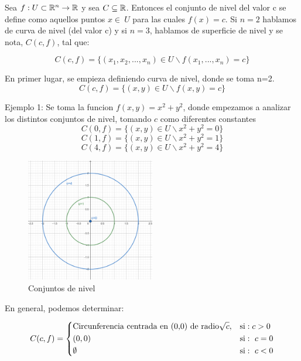 
\begin{definition}  
\label{def:conjunto de nivel}
 \mbox{}
 
Sea $f: U\subset\mathbb{R}^n\rightarrow\mathbb{R}$ y sea $C\subseteq\mathbb{R}$. Entonces el conjunto de nivel del valor c se define como aquellos puntos $x\in\ U$ para las cuales $f(x)=c$. Si $n=2$ hablamos de curva de nivel (del valor c) y si $n=3$, hablamos de superficie de nivel y se nota, $C(c,f)$, tal que:

 \[
C(c,f)=\{(x_1,x_2,...,x_n) \in U \backslash f (x_1,...,x_n)=c \}
 \]

En primer lugar, se empieza definiendo curva de nivel, donde se toma n=2.
 \[
C(c,f)=\{(x,y) \in U \backslash f (x,y)=c \}
 \]

Ejemplo 1: Se toma la funcion $f(x,y)=x^2+y^2$, donde empezamos a analizar los distintos conjuntos de nivel, tomando $c$ como diferentes constantes
 \[
C(0,f)=\{(x,y) \in U \backslash x^2+y^2=0 \}
\]
 \[
C(1,f)=\{(x,y) \in U \backslash x^2+y^2=1 \}
\]
 \[
C(4,f)=\{(x,y) \in U \backslash x^2+y^2=4 \}
 \]

\begin{figure}[h!] %
    \centering
    \includegraphics[width=0.5\textwidth]{../figs/conjunto1_r.png} %
    \caption{Conjuntos de nivel}
    \label{fig:ejemplo} %
\end{figure}

En general, podemos determinar: 

   \[
        C(c,f)=
        \begin{dcases}
           \textnormal{Circunferencia centrada en (0,0) de radio} \sqrt{c},  & \textnormal{si}:  c>0 \\
(0,0)  & \textnormal{si}:\ c=0\\
\emptyset  & \textnormal{si}:\ c<0\\
        \end{dcases}
    \]


\end{definition}
